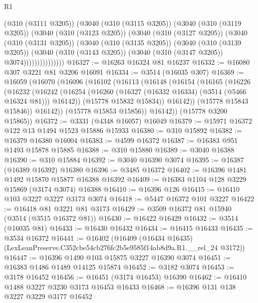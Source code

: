 \begin{lexlean}{R1}
\begin{coremodule}
                (@310 (@3111 @3205))
                (@3040
                  (@310 (@3115 @3205))
                  (@3040
                    (@310 (@3119 @3205))
                    (@3040
                      (@310 (@3123 @3205))
                      (@3040
                        (@310 (@3127 @3205))
                        (@3040
                          (@310 (@3131 @3205))
                          (@3040
                            (@310 (@3135 @3205))
                            (@3040
                              (@310 (@3139 @3205))
                              (@3040
                                (@310 (@3143 @3205))
                                (@3040 (@310 (@3147 @3205)) @3074)))))))))))))))
@16327 := @16263 @16324 @81 @16237
@16332 := @16080 @307 @3221 @81 @3206 @16091
@16334 := @3514 (@16035 @307)
@16369 := @16059
    (@16070
      (@16096
        (@16102
          (@16113
            (@16148
              (@16154
                (@16165
                  (@16226
                    (@16232
                      (@16242
                        (@16254 (@16260 (@16327 (@16332 @16334) (@3514 (@5466 @16324 @81))) @16142))
                        (@15778 @15832 @15834))
                      @16142))
                  (@15778 @15843 @15846))
                @16142))
            (@15778 @15853 @15856))
          @16142))
      (@15778 @3200 @15865))
@16372 := @3331 (@4348 @16057) @16049
@16379 := @15971 @16372 @122 @13 @1494 @1523 @15886 @15933
@16380 := @310 @15892
@16382 := @16379 @16380 @16004
@16383 := @4599 @16372
@16387 := @16383 @951 @1493 @15878 @15885
@16388 := @310 @15880
@16389 := @3040 @16388
@16390 := @310 @15884
@16392 := @3040 @16390 @3074
@16395 := @16387 (@16389 @16392) @16380
@16396 := @3485 @16372
@16402 := @16396 @1481 @1492 @15870 @15877 @16388 @16392
@16409 := @16383 @1104 @128 @3229 @15869 (@3174 @3074) @16388
@16410 := @16396 @126
@16415 := @16410 @103 @3227 @3227 @3173 @3074
@16418 := @5447 @16372 @101 @3227
@16422 := @16418 @81 @3221 @81 @3173
@16429 := @3509 @16372 @81 @15940 (@3514 (@3515 @16372 @81))
@16430 := @16422 @16429
@16432 := @3514 (@16035 @81)
@16433 := @16430 @16432
@16434 := @16415 @16433
@16435 := @3534 @16372
@16441 := @16402
    (@16409 (@16434 @16435) (LexLeanPreserve.C352cbe54cb276fc2b5e9585f14ab8d9a.R1.__rel_24 @3172))
@16447 := @16396 @1490 @103 @15875 @3227 @16390 @3074
@16451 := @16383 @1486 @1489 @14125 @15874
@16452 := @3182 @3074
@16453 := @3178 @16452
@16456 := @16451 (@3174 @16453) @16390
@16462 := @16410 @1488 @3227 @3230 @3173 @16453 @16433
@16468 := @16396 @131 @138 @3227 @3229 @3177 @16452

\end{coremodule}
\end{lexlean}
